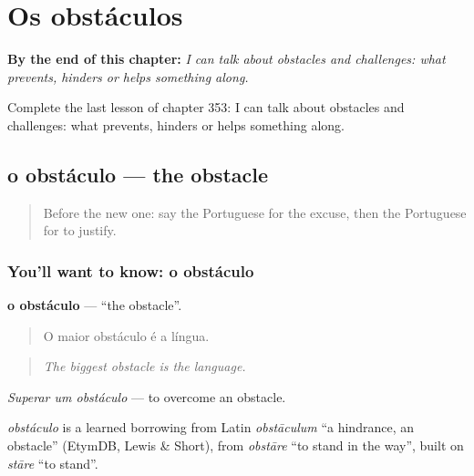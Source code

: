 
\chapter{Os obstáculos}
\label{ch:pt-os-obstaculos}

\begin{chapteropening}
\textbf{By the end of this chapter:} \emph{I can talk about obstacles and challenges: what prevents, hinders or helps something along.}

Complete the last lesson of chapter 353: I can talk about obstacles and challenges: what prevents, hinders or helps something along.
\end{chapteropening}

\section[o obstáculo]{o obstáculo — the obstacle}

\label{lesson:PT-C353-obstaculo}



\begin{quote}
Before the new one: say the Portuguese for the excuse, then the Portuguese for to justify.
\end{quote}

\subsection*{You'll want to know: o obstáculo}
\textbf{o obstáculo} — \textquotedblleft{}the obstacle\textquotedblright{}.

\begin{quote}
O maior obstáculo é a língua.
\end{quote}

\begin{quote}
\emph{The biggest obstacle is the language.}
\end{quote}

\emph{Superar um obstáculo} — to overcome an obstacle.

\begin{cousinweb}
\emph{obstáculo} is a learned borrowing from Latin \emph{obstāculum} \textquotedblleft{}a hindrance, an obstacle\textquotedblright{} (EtymDB, Lewis \& Short), from \emph{obstāre} \textquotedblleft{}to stand in the way\textquotedblright{}, built on \emph{stāre} \textquotedblleft{}to stand\textquotedblright{}.
\end{cousinweb}

